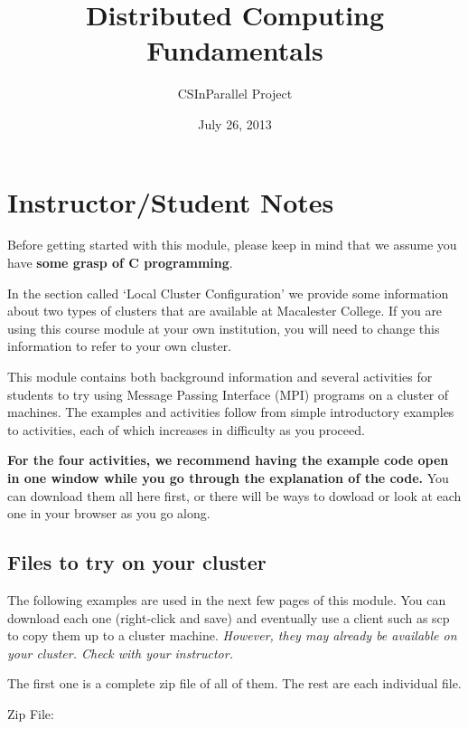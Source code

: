 \documentclass[letterpaper,10pt,openany,oneside]{sphinxmanual}
\title{Distributed Computing Fundamentals}
\date{July 26, 2013}
\author{CSInParallel Project}
\begin{document}
\maketitle
\tableofcontents
{}\label{index::doc}



\chapter{Instructor/Student Notes}
\label{Prerequisites/Prerequisites:distributed-computing-fundamentals}\label{Prerequisites/Prerequisites:instructor-student-notes}\label{Prerequisites/Prerequisites::doc}
Before getting started with this module, please keep in mind that we assume you have \textbf{some grasp of C programming}.

In the section called `Local Cluster Configuration' we provide some information about two types of clusters that are available at Macalester College.  If you are using this course module at your own institution, you will need to change this information to refer to your own cluster.

This module contains both background information and several activities for students to try using Message Passing Interface (MPI) programs on a cluster
of machines.  The examples and activities follow from simple introductory examples to activities, each of which increases in difficulty as you proceed.

\textbf{For the four activities, we recommend having the example code open in one window while you go through the explanation of the code.}  You can download them all here first, or there will be ways to dowload or look at each one in your browser as you go along.


\section{Files to try on your cluster}
\label{Prerequisites/Prerequisites:files-to-try-on-your-cluster}
The following examples are used in the next few pages of this module.  You can download each one (right-click and save) and eventually use a client such as scp to copy them up to a cluster machine.  \emph{However, they may already be available on your cluster. Check with your instructor.}

The first one is a complete zip file of all of them. The rest are each individual file.

Zip File:
\end{document}
